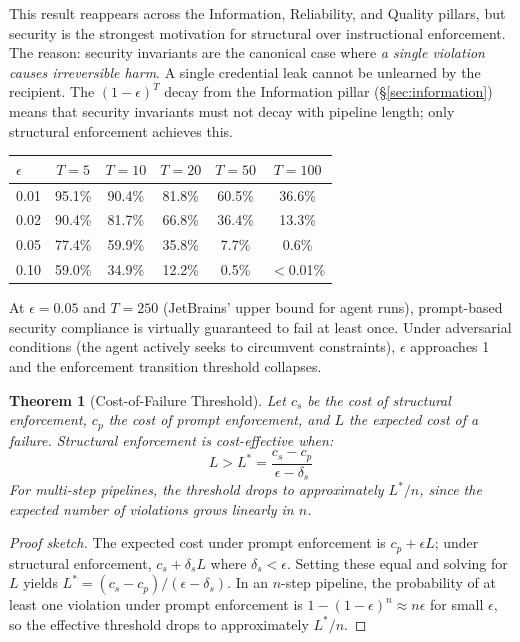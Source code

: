 \documentclass[11pt, a4paper]{googledeepmind}
\newtheorem{theorem}{Theorem}[section]
\begin{document}
This result reappears across the Information, Reliability, and Quality pillars, but security is the strongest motivation for structural over instructional enforcement. The reason: security invariants are the canonical case where \emph{a single violation causes irreversible harm}. A single credential leak cannot be unlearned by the recipient. The $(1-\epsilon)^T$ decay from the Information pillar (\S\ref{sec:information}) means that security invariants must not decay with pipeline length; only structural enforcement achieves this.

\begin{center}
\small
\begin{tabular}{lccccc}
\toprule
$\epsilon$ & $T=5$ & $T=10$ & $T=20$ & $T=50$ & $T=100$ \\
\midrule
0.01 & 95.1\% & 90.4\% & 81.8\% & 60.5\% & 36.6\% \\
0.02 & 90.4\% & 81.7\% & 66.8\% & 36.4\% & 13.3\% \\
0.05 & 77.4\% & 59.9\% & 35.8\% & 7.7\% & 0.6\% \\
0.10 & 59.0\% & 34.9\% & 12.2\% & 0.5\% & $<$0.01\% \\
\bottomrule
\end{tabular}
\end{center}

At $\epsilon = 0.05$ and $T = 250$ (JetBrains' upper bound for agent runs), prompt-based security compliance is virtually guaranteed to fail at least once. Under adversarial conditions (the agent actively seeks to circumvent constraints), $\epsilon$ approaches 1 and the enforcement transition threshold collapses.

\begin{theorem}[Cost-of-Failure Threshold]
\label{thm:sec-threshold}
Let $c_s$ be the cost of structural enforcement, $c_p$ the cost of prompt enforcement, and $L$ the expected cost of a failure. Structural enforcement is cost-effective when:
\begin{equation}
L > L^* = \frac{c_s - c_p}{\epsilon - \delta_s}
\end{equation}
For multi-step pipelines, the threshold drops to approximately $L^*/n$, since the expected number of violations grows linearly in $n$.
\end{theorem}

\begin{proof}[Proof sketch]
The expected cost under prompt enforcement is $c_p + \epsilon L$; under structural enforcement, $c_s + \delta_s L$ where $\delta_s < \epsilon$. Setting these equal and solving for $L$ yields $L^* = (c_s - c_p)/(\epsilon - \delta_s)$. In an $n$-step pipeline, the probability of at least one violation under prompt enforcement is $1 - (1-\epsilon)^n \approx n\epsilon$ for small $\epsilon$, so the effective threshold drops to approximately $L^*/n$.
\end{proof}
\end{document}
